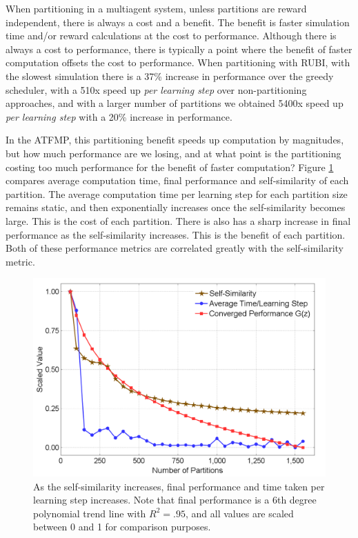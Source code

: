 \documentclass[letterpaper]{article}
\begin{document}
When partitioning in a multiagent system, unless partitions are reward independent, there is always a cost and a benefit. The benefit is faster simulation time and/or reward calculations at the cost to performance. Although there is always a cost to performance, there is typically a point where the benefit of faster computation offsets the cost to performance. When partitioning with RUBI, with the slowest simulation there is a 37\% increase in performance over the greedy scheduler, with a 510x speed up \textit{per learning step} over non-partitioning approaches, and with a larger number of partitions we obtained 5400x speed up \textit{per learning step} with a 20\% increase in performance.

In the ATFMP, this partitioning benefit speeds up computation by magnitudes, but how much performance are we losing, and at what point is the partitioning costing too much performance for the benefit of faster computation? Figure \ref{NewPartitionComparisons} compares average computation time, final performance and self-similarity of each partition. The average computation time per learning step for each partition size remains static, and then exponentially increases once the self-similarity becomes large. This is the cost of each partition. There is also has a sharp increase in final performance as the self-similarity increases. This is the benefit of each partition. Both of these performance metrics are correlated greatly with the self-similarity metric.


\begin{figure}
\centering
\includegraphics[width=1.0\columnwidth]{NewPartitionComparisons}
\caption{As the self-similarity increases, final performance and time taken per learning step increases. Note that final performance is a 6th degree polynomial trend line with $R^2 = .95$, and all values are scaled between 0 and 1 for comparison purposes.}
\label{NewPartitionComparisons}
\end{figure}
\end{document}
